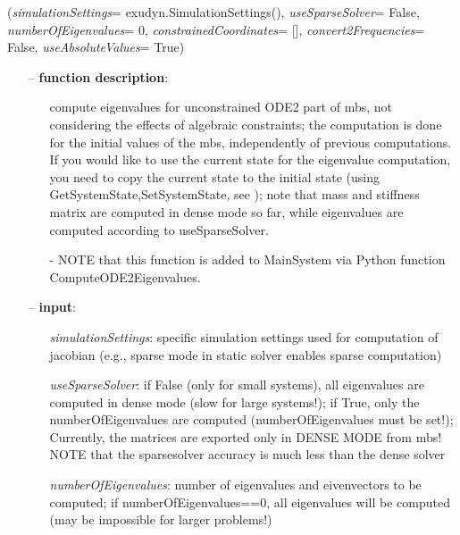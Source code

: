 %
\begin{flushleft}
\label{sec:mainsystemextensions:ComputeODE2Eigenvalues}
({\it simulationSettings}= exudyn.SimulationSettings(), {\it useSparseSolver}= False, {\it numberOfEigenvalues}= 0, {\it constrainedCoordinates}= [], {\it convert2Frequencies}= False, {\it useAbsoluteValues}= True)
\end{flushleft}
\setlength{\itemindent}{0.7cm}
\begin{itemize}[leftmargin=0.7cm]
\item[--]
{\bf function description}: \vspace{-6pt}
\begin{itemize}[leftmargin=1.2cm]
\setlength{\itemindent}{-0.7cm}
\item[]compute eigenvalues for unconstrained ODE2 part of mbs, not considering the effects of algebraic constraints; the computation is done for the initial values of the mbs, independently of previous computations. If you would like to use the current state for the eigenvalue computation, you need to copy the current state to the initial state (using GetSystemState,SetSystemState, see ); note that mass and stiffness matrix are computed in dense mode so far, while eigenvalues are computed according to useSparseSolver.
\item[]- NOTE that this function is added to MainSystem via Python function ComputeODE2Eigenvalues.
\end{itemize}
\item[--]
{\bf input}: \vspace{-6pt}
\begin{itemize}[leftmargin=1.2cm]
\setlength{\itemindent}{-0.7cm}
\item[]{\it simulationSettings}: specific simulation settings used for computation of jacobian (e.g., sparse mode in static solver enables sparse computation)
\item[]{\it useSparseSolver}: if False (only for small systems), all eigenvalues are computed in dense mode (slow for large systems!); if True, only the numberOfEigenvalues are computed (numberOfEigenvalues must be set!); Currently, the matrices are exported only in DENSE MODE from mbs! NOTE that the sparsesolver accuracy is much less than the dense solver
\item[]{\it numberOfEigenvalues}: number of eigenvalues and eivenvectors to be computed; if numberOfEigenvalues==0, all eigenvalues will be computed (may be impossible for larger problems!)

\end{itemize}
\end{itemize}
